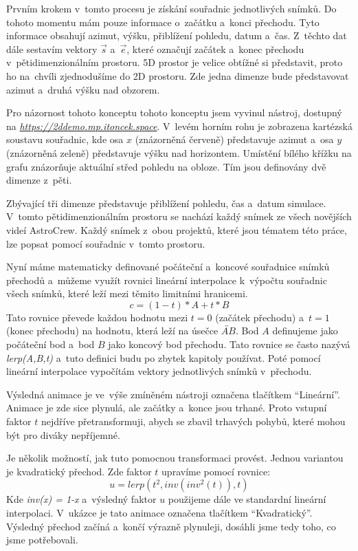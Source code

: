 \documentclass[12pt,a4paper,titlepage]{article}
\newcommand{\link}[2]{\href{#1}{\textcolor{link-color}{\textit{#2}}}}%
\begin{document}
Prvním krokem v~tomto procesu je získání souřadnic jednotlivých snímků. Do tohoto momentu mám pouze informace o~začátku a~konci přechodu. Tyto informace obsahují azimut, výšku, přiblížení pohledu, datum a~čas. Z~těchto dat dále sestavím vektory $\vec{s}$ a~$\vec{e}$, které označují začátek a~konec přechodu v~pětidimenzionálním prostoru. 5D prostor je velice obtížné si představit, proto ho na~chvíli zjednodušíme do 2D prostoru. Zde jedna dimenze bude představovat azimut a~druhá výšku nad obzorem. 

Pro názornost tohoto konceptu tohoto konceptu jsem vyvinul nástroj, dostupný na \link{https://2ddemo.mp.itoncek.space}{https://2ddemo.mp.itoncek.space}. V~levém horním rohu je zobrazena kartézská soustavu souřadnic, kde osa $x$ (znázorněná červeně) představuje azimut a~osa $y$ (znázorněná zeleně) představuje výšku nad horizontem. Umístění bílého křížku na grafu znázorňuje aktuální střed pohledu na obloze. Tím jsou definovány dvě dimenze z~pěti.

Zbývající tři dimenze představuje přiblížení pohledu, čas a~datum simulace. V~tomto pětidimenzionálním prostoru se nachází každý snímek ze všech novějších videí AstroCrew. Každý snímek z~obou projektů, které jsou tématem této práce, lze popsat pomocí souřadnic v~tomto prostoru.

Nyní máme matematicky definované počáteční a~koncové souřadnice snímků přechodů a~můžeme využít rovnici lineární interpolace k~výpočtu souřadnic všech snímků, které leží mezi těmito limitními hranicemi.
\[c = (1-t)*A + t * B\] 
Tato rovnice převede každou hodnotu mezi $t=0$ (začátek přechodu) a~$t=1$ (konec přechodu) na hodnotu, která leží na úsečce $\overleftrightarrow{AB}$. Bod $A$ definujeme jako počáteční bod a~bod $B$ jako koncový bod přechodu. Tato rovnice se často nazývá \textit{lerp(A,B,t)} a~tuto definici budu po zbytek kapitoly používat. Poté pomocí lineární interpolace vypočítám vektory jednotlivých snímků v~přechodu.%

Výsledná animace je ve~výše zmíněném nástroji označena tlačítkem \enquote{Lineární}. Animace je zde sice plynulá, ale začátky a~konce jsou trhané. Proto vstupní faktor $t$ nejdříve přetransformuji, abych se zbavil trhavých pohybů, které mohou být pro diváky nepříjemné. 

Je několik možností, jak tuto pomocnou transformaci provést. Jednou variantou je kvadratický přechod. Zde faktor $t$ upravíme pomocí rovnice:
\[u = lerp({t}^{2}, inv({inv}^{2}(t)), t)\]
Kde \textit{inv(x) = 1-x} a~výsledný faktor $u$ použijeme dále ve standardní lineární interpolaci.  V~ukázce je tato animace označena tlačítkem \enquote{Kvadratický}. Výsledný přechod začíná a~končí výrazně plynuleji, dosáhli jsme tedy toho, co jsme potřebovali. %
\end{document}
